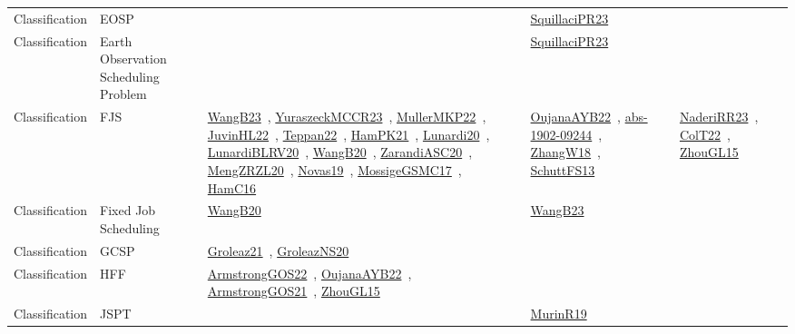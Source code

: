 {\begin{longtable}{lp{3cm}>{\raggedright\arraybackslash}p{6cm}>{\raggedright\arraybackslash}p{6cm}>{\raggedright\arraybackslash}p{8cm}}
Classification & EOSP &  & \href{works/SquillaciPR23.pdf}{SquillaciPR23}~\cite{SquillaciPR23} & \\
Classification & Earth Observation Scheduling Problem &  & \href{works/SquillaciPR23.pdf}{SquillaciPR23}~\cite{SquillaciPR23} & \\
Classification & FJS & \href{works/WangB23.pdf}{WangB23}~\cite{WangB23}, \href{works/YuraszeckMCCR23.pdf}{YuraszeckMCCR23}~\cite{YuraszeckMCCR23}, \href{works/MullerMKP22.pdf}{MullerMKP22}~\cite{MullerMKP22}, \href{works/JuvinHL22.pdf}{JuvinHL22}~\cite{JuvinHL22}, \href{works/Teppan22.pdf}{Teppan22}~\cite{Teppan22}, \href{works/HamPK21.pdf}{HamPK21}~\cite{HamPK21}, \href{works/Lunardi20.pdf}{Lunardi20}~\cite{Lunardi20}, \href{works/LunardiBLRV20.pdf}{LunardiBLRV20}~\cite{LunardiBLRV20}, \href{works/WangB20.pdf}{WangB20}~\cite{WangB20}, \href{works/ZarandiASC20.pdf}{ZarandiASC20}~\cite{ZarandiASC20}, \href{works/MengZRZL20.pdf}{MengZRZL20}~\cite{MengZRZL20}, \href{works/Novas19.pdf}{Novas19}~\cite{Novas19}, \href{works/MossigeGSMC17.pdf}{MossigeGSMC17}~\cite{MossigeGSMC17}, \href{works/HamC16.pdf}{HamC16}~\cite{HamC16} & \href{works/OujanaAYB22.pdf}{OujanaAYB22}~\cite{OujanaAYB22}, \href{works/abs-1902-09244.pdf}{abs-1902-09244}~\cite{abs-1902-09244}, \href{works/ZhangW18.pdf}{ZhangW18}~\cite{ZhangW18}, \href{works/SchuttFS13.pdf}{SchuttFS13}~\cite{SchuttFS13} & \href{works/NaderiRR23.pdf}{NaderiRR23}~\cite{NaderiRR23}, \href{works/ColT22.pdf}{ColT22}~\cite{ColT22}, \href{works/ZhouGL15.pdf}{ZhouGL15}~\cite{ZhouGL15}\\
Classification & Fixed Job Scheduling & \href{works/WangB20.pdf}{WangB20}~\cite{WangB20} & \href{works/WangB23.pdf}{WangB23}~\cite{WangB23} & \\
Classification & GCSP & \href{works/Groleaz21.pdf}{Groleaz21}~\cite{Groleaz21}, \href{works/GroleazNS20.pdf}{GroleazNS20}~\cite{GroleazNS20} &  & \\
Classification & HFF & \href{works/ArmstrongGOS22.pdf}{ArmstrongGOS22}~\cite{ArmstrongGOS22}, \href{works/OujanaAYB22.pdf}{OujanaAYB22}~\cite{OujanaAYB22}, \href{works/ArmstrongGOS21.pdf}{ArmstrongGOS21}~\cite{ArmstrongGOS21}, \href{works/ZhouGL15.pdf}{ZhouGL15}~\cite{ZhouGL15} &  & \\
Classification & JSPT &  & \href{works/MurinR19.pdf}{MurinR19}~\cite{MurinR19} & \\

\end{longtable}}
